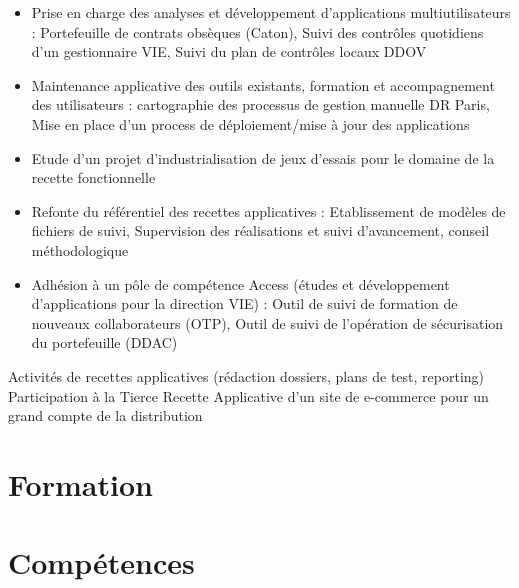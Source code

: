 \documentclass[10pt,a4paper]{moderncv}
\begin{document}
{
\begin{itemize}
  \item Prise en charge des analyses et développement d’applications multiutilisateurs : Portefeuille de contrats obsèques (Caton), Suivi des contrôles quotidiens d'un gestionnaire VIE, Suivi du plan de contrôles locaux DDOV
  \item Maintenance applicative des outils existants, formation et accompagnement des utilisateurs : cartographie des processus de gestion manuelle DR Paris, Mise en place d'un process de déploiement/mise à jour des applications
\end{itemize}
}

{
\begin{itemize}
 \item Etude d'un projet d'industrialisation de jeux d'essais pour le domaine de la recette fonctionnelle
 \item Refonte du référentiel des recettes applicatives : Etablissement de modèles de fichiers de suivi, Supervision des réalisations et suivi d’avancement, conseil méthodologique
 \item Adhésion à un pôle de compétence Access (études et développement d'applications pour la direction VIE) : Outil de suivi de formation de nouveaux collaborateurs (OTP), Outil de suivi de l'opération de sécurisation du portefeuille (DDAC)
\end{itemize}
}

{Activités de recettes applicatives (rédaction dossiers, plans de test, reporting)
Participation à la Tierce Recette Applicative d'un site de e-commerce pour un grand compte de la distribution}

\bigskip

\section{Formation}


\section{Compétences}
\end{document}
